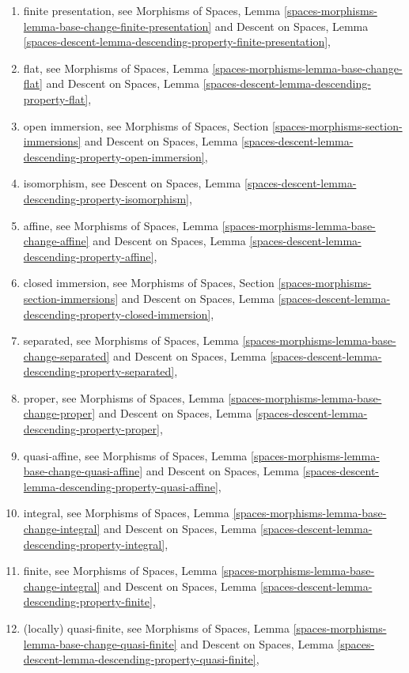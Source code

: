 \begin{enumerate}
\item finite presentation, see
Morphisms of Spaces,
Lemma \ref{spaces-morphisms-lemma-base-change-finite-presentation}
and
Descent on Spaces, Lemma
\ref{spaces-descent-lemma-descending-property-finite-presentation},
\item flat, see
Morphisms of Spaces,
Lemma \ref{spaces-morphisms-lemma-base-change-flat}
and
Descent on Spaces,
Lemma \ref{spaces-descent-lemma-descending-property-flat},
\item open immersion, see
Morphisms of Spaces,
Section \ref{spaces-morphisms-section-immersions}
and
Descent on Spaces,
Lemma \ref{spaces-descent-lemma-descending-property-open-immersion},
\item isomorphism, see
Descent on Spaces,
Lemma \ref{spaces-descent-lemma-descending-property-isomorphism},
\item affine, see
Morphisms of Spaces,
Lemma \ref{spaces-morphisms-lemma-base-change-affine}
and
Descent on Spaces,
Lemma \ref{spaces-descent-lemma-descending-property-affine},
\item closed immersion, see
Morphisms of Spaces, Section \ref{spaces-morphisms-section-immersions}
and
Descent on Spaces,
Lemma \ref{spaces-descent-lemma-descending-property-closed-immersion},
\item separated, see
Morphisms of Spaces,
Lemma \ref{spaces-morphisms-lemma-base-change-separated}
and
Descent on Spaces,
Lemma \ref{spaces-descent-lemma-descending-property-separated},
\item proper, see
Morphisms of Spaces,
Lemma \ref{spaces-morphisms-lemma-base-change-proper}
and
Descent on Spaces,
Lemma \ref{spaces-descent-lemma-descending-property-proper},
\item quasi-affine, see
Morphisms of Spaces,
Lemma \ref{spaces-morphisms-lemma-base-change-quasi-affine}
and
Descent on Spaces,
Lemma \ref{spaces-descent-lemma-descending-property-quasi-affine},
\item integral, see
Morphisms of Spaces,
Lemma \ref{spaces-morphisms-lemma-base-change-integral}
and
Descent on Spaces,
Lemma \ref{spaces-descent-lemma-descending-property-integral},
\item finite, see
Morphisms of Spaces,
Lemma \ref{spaces-morphisms-lemma-base-change-integral}
and
Descent on Spaces,
Lemma \ref{spaces-descent-lemma-descending-property-finite},
\item (locally) quasi-finite, see
Morphisms of Spaces,
Lemma \ref{spaces-morphisms-lemma-base-change-quasi-finite}
and
Descent on Spaces,
Lemma \ref{spaces-descent-lemma-descending-property-quasi-finite},

\end{enumerate}
